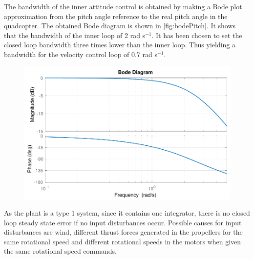 The bandwidth of the inner attitude control is obtained by making a Bode plot approximation from the pitch angle reference to the real pitch angle in the quadcopter. The obtained Bode diagram is shown in \autoref{fig:bodePitch}. It shows that the bandwidth of the inner loop of 2 rad s$^{-1}$. It has been chosen to set the closed loop bandwidth three times lower than the inner loop. Thus yielding a bandwidth for the velocity control loop of 0.7 rad s$^{-1}$.
%
\begin{figure}[H]
    \includegraphics[scale=.7]{figures/bodePitch}
    \centering			
    \label{fig:bodePitch}
\end{figure} 
%
%
%
As the plant is a type 1 system, since it contains one integrator, there is no closed loop steady state error if no input disturbances occur. Possible causes for input disturbances are wind, different thrust forces generated in the propellers for the same rotational speed and different rotational speeds in the motors when given the same rotational speed commands.

